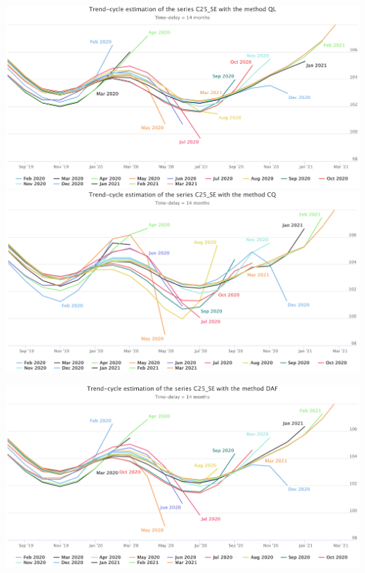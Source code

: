 \documentclass[10pt,xcolor=table,color={dvipsnames,usenames},ignorenonframetext,usepdftitle=false,english]{beamer}
\newcommand\1{\mathds{1}}
\begin{document}
\begin{frame}{}
\protect\hypertarget{section-1}{}
\centering

\includegraphics[height = 0.5\paperheight]{img/C25SE_ql}
\includegraphics[height = 0.5\paperheight]{img/C25SE_cq}
\end{frame}

\begin{frame}{}
\protect\hypertarget{section-2}{}
\centering

\includegraphics[height = 0.5\paperheight]{img/C25SE_daf}
\end{frame}
\end{document}
